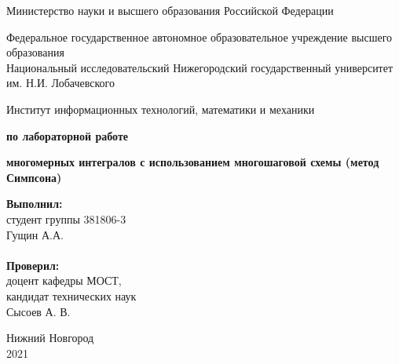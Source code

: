 \documentclass{report}
\begin{document}
\begin{titlepage}

\begin{center}
Министерство науки и высшего образования Российской Федерации
\end{center}

\begin{center}
Федеральное государственное автономное образовательное учреждение высшего образования \\
Национальный исследовательский Нижегородский государственный университет им. Н.И. Лобачевского
\end{center}

\begin{center}
Институт информационных технологий, математики и механики
\end{center}

\vspace{4em}

\begin{center}
\textbf{ по лабораторной работе} \\
\end{center}
\begin{center}
\textbf{ многомерных интегралов с использованием многошаговой схемы (метод Симпсона)} \\
\end{center}

\vspace{4em}

\newbox{\lbox}
\newlength{\maxl}
\setlength{\maxl}{\wd\lbox}
\hfill\parbox{7cm}{
\hspace*{5cm}\hspace*{-5cm}\textbf{Выполнил:} \\ студент группы 381806-3 \\ Гущин А.А.\\
\\
\hspace*{5cm}\hspace*{-5cm}\textbf{Проверил:}\\ доцент кафедры МОСТ, \\ кандидат технических наук \\ Сысоев А. В.
}

\vspace{\fill}

\begin{center} Нижний Новгород \\ 2021 \end{center}

\end{titlepage}
\end{document}
